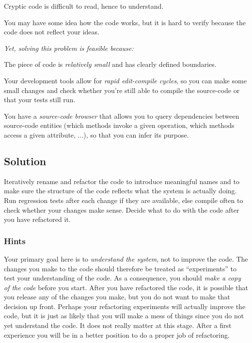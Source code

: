 \documentclass[a4paper,10pt,twoside]{book}
\begin{document}
\begin{bulletlist}
\item Cryptic code is difficult to read, hence to understand.

\item You may have some idea how the code works, but it is hard to verify because the code does not reflect your ideas.
\end{bulletlist}

\emph{Yet, solving this problem is feasible because:}

\begin{bulletlist}
\item The piece of code is \emph{relatively small} and has clearly defined boundaries.

\item Your development tools allow for \emph{rapid edit-compile cycles}, so you can make some small changes and check whether you're still able to compile the source-code or that your tests still run.

\item You have a \emph{source-code browser} that allows you to query dependencies between source-code entities (\ie which methods invoke a given operation, which methods access a given attribute, ...), so that you can infer its purpose.
\end{bulletlist}

\subsection*{Solution}

Iteratively rename and refactor the code to introduce meaningful names and to make sure the structure of the code reflects what the system is actually doing. Run regression tests after each change if they are available, else compile often to check whether your changes make sense. Decide what to do with the code after you have refactored it.

\subsubsection*{Hints}

Your primary goal here is to \emph{understand the system}, not to improve the code. The changes you make to the code should therefore be treated as ``experiments'' to test your understanding of the code. As a consequence, you should \emph{make a copy of the code} before you start. After you have refactored the code, it is possible that you release any of the changes you make, but you do not want to make that decision up front. Perhaps your refactoring experiments will actually improve the code, but it is just as likely that you will make a mess of things since you do not yet understand the code. It does not really matter at this stage. After a first experience you will be in a better position to do a proper job of refactoring. 
\end{document}
